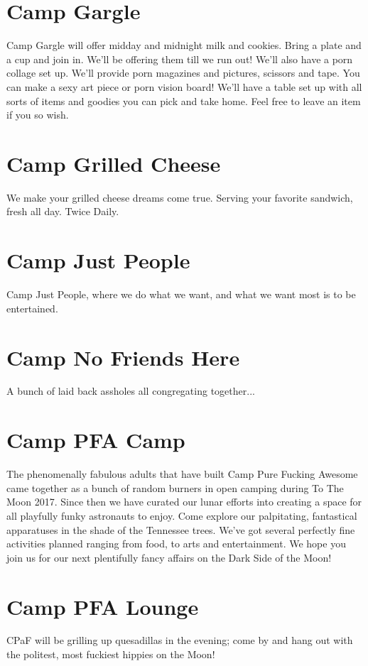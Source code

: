 \section*{Camp Gargle}
Camp Gargle will offer midday and midnight milk and cookies. Bring a plate and a cup and join in. We'll be offering them till we run out!
We'll also have a porn collage set up. We'll provide porn magazines and pictures, scissors and tape. You can make a sexy art piece or porn vision board! We'll have a table set up with all sorts of items and goodies you can pick and take home. Feel free to leave an item if you so wish.  


\section*{Camp Grilled Cheese}
We make your grilled cheese dreams come true. Serving your favorite sandwich, fresh all day. Twice Daily. 


\section*{Camp Just People}
Camp Just People, where we do what we want, and what we want most is to be entertained. 


\section*{Camp No Friends Here}
A bunch of laid back assholes all congregating together... 


\section*{Camp PFA Camp}
The phenomenally fabulous adults that have built Camp Pure Fucking Awesome came together as a bunch of random burners in open camping during To The Moon 2017. Since then we have curated our lunar efforts into creating a space for all playfully funky astronauts to enjoy. Come explore our palpitating, fantastical apparatuses in the shade of the Tennessee trees. We've got several perfectly fine activities planned ranging from food, to arts and entertainment. We hope you join us for our next plentifully fancy affairs on the Dark Side of the Moon! 


\section*{Camp PFA Lounge}
CPaF will be grilling up quesadillas in the evening; come by and hang out with the politest, most fuckiest hippies on the Moon! 


